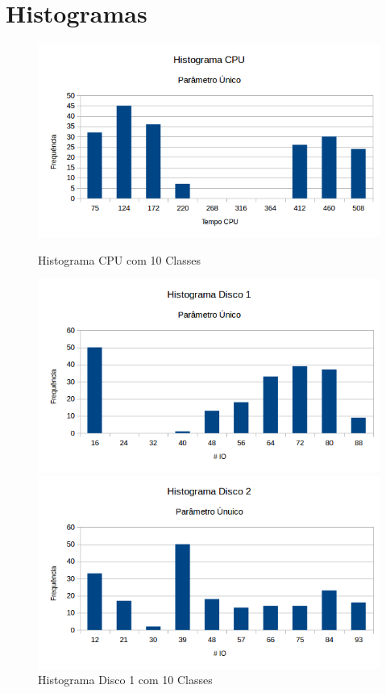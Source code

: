 \documentclass[11pt,a4paper,openany,oneside]{abntex2}
\begin{document}
\section{\textbf{Histogramas}}
\label{qbh}
\begin{figure}[H]
	\begin{minipage}[b]{0.45\linewidth}
		\centering
		\includegraphics[width=\textwidth]{histogramacpu.png}
		\caption{Histograma CPU com 10 Classes}
		\label{fig:histocpu}
	\end{minipage}
	\hspace{0.5cm}
	\begin{minipage}[b]{0.45\linewidth}
		\centering
		\includegraphics[width=\textwidth]{histogranadsico.png}
		\caption{Histograma Disco 1 com 10 Classes}
		\label{fig:histod1}
	\end{minipage}
	\hspace{0.5cm}
	\begin{minipage}[t]{0.45\linewidth}
		\centering
		\includegraphics[width=\textwidth]{histogramadsic2.png}

\end{minipage}
\end{figure}
\end{document}
